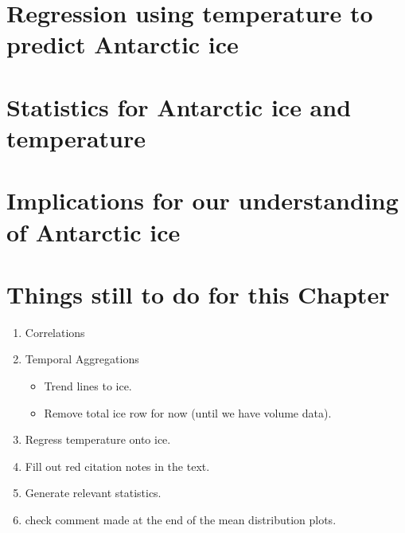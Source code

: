 \documentclass[../main.tex]{subfiles}
\begin{document}
\section[Regressions]{Regression using temperature to predict Antarctic ice}
\label{sec:regressions_temp_ice}

\section[Statistics]{Statistics for Antarctic ice and temperature}

\section[Implications]{Implications for our understanding of Antarctic ice          }

\pagebreak
\section*{Things still to do for this Chapter}
\begin{enumerate}
    \item Correlations
    \item Temporal Aggregations
    \begin{itemize}
        \item Trend lines to ice.
        \item Remove total ice row for now (until we have volume data).
    \end{itemize}
    \item Regress temperature onto ice.
    \item Fill out red citation notes in the text.
    \item Generate relevant statistics.
    \item check comment made at the end of the mean distribution plots.
\end{enumerate}
\end{document}
